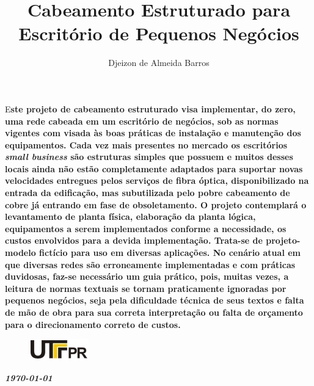 \documentclass[	DIV=calc,%
							paper=a4,%
							fontsize=12pt,%
							onecolumn]{scrartcl}	 					%
\title{Cabeamento Estruturado para Escritório de Pequenos Negócios}
\author{Djeizon de Almeida Barros}  	%
\date{}																				%
\newcommand{\initial}[1]{%
     \lettrine[lines=3,lhang=0.3,nindent=0em]{
     				\color{DarkBlue}
     				{\textsf{#1}}}{}}
\begin{document}
\maketitle
\thispagestyle{fancy} 	
\thispagestyle{empty}		%





\initial{E}\textbf{ste projeto de cabeamento estruturado visa implementar, do zero, uma rede cabeada em um escritório de negócios, sob as normas vigentes com visada às boas práticas de instalação e manutenção dos equipamentos. Cada vez mais presentes no mercado os escritórios \textit{small business} são estruturas simples que possuem e muitos desses locais ainda não estão completamente adaptados para suportar novas velocidades entregues pelos serviços de fibra óptica, disponibilizado na entrada da edificação, mas subutilizada pelo pobre cabeamento de cobre já entrando em fase de obsoletamento. O projeto contemplará o levantamento de planta física, elaboração da planta lógica, equipamentos a serem implementados conforme a necessidade, os custos envolvidos para a devida implementação. Trata-se de projeto-modelo fictício para uso em diversas aplicações. No cenário atual em que diversas redes são erroneamente implementadas e com práticas duvidosas, faz-se necessário um guia prático, pois, muitas vezes, a leitura de normas textuais se tornam praticamente ignoradas por pequenos negócios, seja pela dificuldade técnica de seus textos e falta de mão de obra para sua correta interpretação ou falta de orçamento para o direcionamento correto de custos.}


\begin{figure}
	\centering
	\includegraphics{utfpr}
\end{figure}

\vspace{2cm}
\centerline{\textit{\textbf{\today}}}

\clearpage
    \renewcommand*\listfigurename{Lista de figuras}
\listoffigures

\renewcommand*\listtablename{Lista de tabelas}
\listoftables
\end{document}
